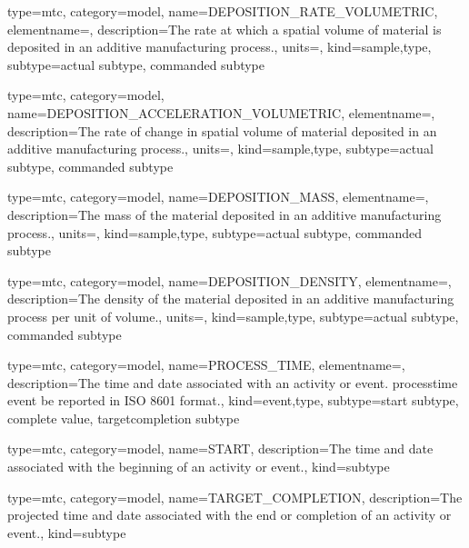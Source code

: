 {
  type=mtc,
  category=model,
  name={DEPOSITION\_RATE\_VOLUMETRIC},
  elementname=,
  description={The rate at which a spatial volume of material is deposited in an additive manufacturing process.},
  units=,
  kind={sample,type},
  subtype={\gls{actual subtype}, \gls{commanded subtype}}
}


{
  type=mtc,
  category=model,
  name={DEPOSITION\_ACCELERATION\_VOLUMETRIC},
  elementname=,
  description={The rate of change in spatial volume of material deposited in an additive manufacturing process.},
  units=,
  kind={sample,type},
  subtype={\gls{actual subtype}, \gls{commanded subtype}}
}


{
  type=mtc,
  category=model,
  name={DEPOSITION\_MASS},
  elementname=,
  description={The mass of the material deposited in an additive manufacturing process.},
  units=,
  kind={sample,type},
  subtype={\gls{actual subtype}, \gls{commanded subtype}}
}


{
  type=mtc,
  category=model,
  name={DEPOSITION\_DENSITY},
  elementname=,
  description={The density of the material deposited in an additive manufacturing process per unit of volume.},
  units=,
  kind={sample,type},
  subtype={\gls{actual subtype}, \gls{commanded subtype}}
}


{
  type=mtc,
  category=model,
  name={PROCESS\_TIME},
  elementname=,
  description={The time and date associated with an activity or event.
  \newline \gls{processtime event} \MUST be reported in ISO 8601 format.},
  kind={event,type},
  subtype={\gls{start subtype}, \gls{complete value}, \gls{targetcompletion subtype}}
}


{
  type=mtc,
  category=model,
  name={START},
  description={The time and date associated with the beginning of an activity or event.},
  kind={subtype}
}


{
  type=mtc,
  category=model,
  name={TARGET\_COMPLETION},
  description={The projected time and date associated with the end or completion of an activity or event.},
  kind={subtype}
}


